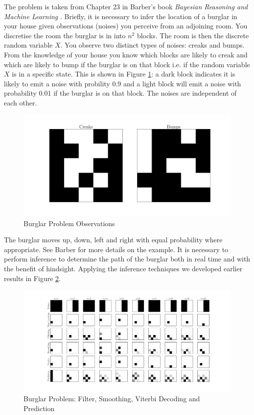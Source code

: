 \documentclass[../masters.tex]{subfiles}
\begin{document}
The problem is taken from Chapter 23 in Barber's book \textit{Bayesian Reasoning and Machine Learning} \cite{barber}. Briefly, it is necessary to infer the location of a burglar in your house given observations (noises) you perceive from an adjoining room. You discretise the room the burglar is in into $n^2$ blocks. The room is then the discrete random variable $X$. You observe two distinct types of noises: creaks and bumps. From the knowledge of your house you know which blocks are likely to creak and which are likely to bump if the burglar is on that block i.e. if the random variable $X$ is in a specific state. This is shown in Figure \ref{fig_burlgar_observations}: a dark block indicates it is likely to emit a noise with probility 0.9 and a light block will emit a noise with probability 0.01 if the burglar is on that block. The noises are independent of each other.
\begin{figure}[H] 
\centering
\includegraphics[scale=0.20]{burglar_observations.pdf}
\caption{Burglar Problem Observations}
\label{fig_burlgar_observations}
\end{figure}
The burglar moves up, down, left and right with equal probability where appropriate. See Barber for more details on the example. It is necessary to perform inference to determine the path of the burglar both in real time and with the benefit of hindsight. Applying the inference techniques we developed earlier results in Figure \ref{fig_burglar_inference}. 
\begin{figure}[H] 
\centering
\includegraphics[scale=0.29]{burglar_inference.pdf}
\caption{Burglar Problem: Filter, Smoothing, Viterbi Decoding and Prediction}
\label{fig_burglar_inference}
\end{figure}
\end{document}
